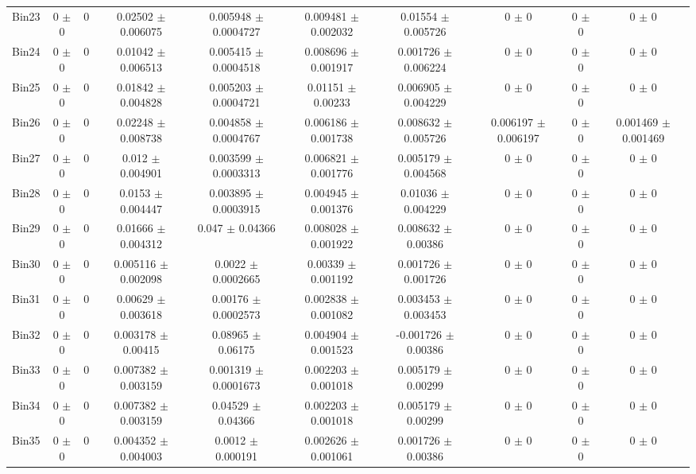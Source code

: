 \begin{tabular}{@{\extracolsep{4pt}}lccccccccc@{}}
     Bin23 & 0 $\pm$ 0 & 0 & 0.02502 $\pm$ 0.006075 & 0.005948 $\pm$ 0.0004727 & 0.009481 $\pm$ 0.002032 & 0.01554 $\pm$ 0.005726 & 0 $\pm$ 0 & 0 $\pm$ 0 & 0 $\pm$ 0 \\ 
     Bin24 & 0 $\pm$ 0 & 0 & 0.01042 $\pm$ 0.006513 & 0.005415 $\pm$ 0.0004518 & 0.008696 $\pm$ 0.001917 & 0.001726 $\pm$ 0.006224 & 0 $\pm$ 0 & 0 $\pm$ 0 & 0 $\pm$ 0 \\ 
     Bin25 & 0 $\pm$ 0 & 0 & 0.01842 $\pm$ 0.004828 & 0.005203 $\pm$ 0.0004721 & 0.01151 $\pm$ 0.00233 & 0.006905 $\pm$ 0.004229 & 0 $\pm$ 0 & 0 $\pm$ 0 & 0 $\pm$ 0 \\ 
     Bin26 & 0 $\pm$ 0 & 0 & 0.02248 $\pm$ 0.008738 & 0.004858 $\pm$ 0.0004767 & 0.006186 $\pm$ 0.001738 & 0.008632 $\pm$ 0.005726 & 0.006197 $\pm$ 0.006197 & 0 $\pm$ 0 & 0.001469 $\pm$ 0.001469 \\ 
     Bin27 & 0 $\pm$ 0 & 0 & 0.012 $\pm$ 0.004901 & 0.003599 $\pm$ 0.0003313 & 0.006821 $\pm$ 0.001776 & 0.005179 $\pm$ 0.004568 & 0 $\pm$ 0 & 0 $\pm$ 0 & 0 $\pm$ 0 \\ 
     Bin28 & 0 $\pm$ 0 & 0 & 0.0153 $\pm$ 0.004447 & 0.003895 $\pm$ 0.0003915 & 0.004945 $\pm$ 0.001376 & 0.01036 $\pm$ 0.004229 & 0 $\pm$ 0 & 0 $\pm$ 0 & 0 $\pm$ 0 \\ 
     Bin29 & 0 $\pm$ 0 & 0 & 0.01666 $\pm$ 0.004312 & 0.047 $\pm$ 0.04366 & 0.008028 $\pm$ 0.001922 & 0.008632 $\pm$ 0.00386 & 0 $\pm$ 0 & 0 $\pm$ 0 & 0 $\pm$ 0 \\ 
     Bin30 & 0 $\pm$ 0 & 0 & 0.005116 $\pm$ 0.002098 & 0.0022 $\pm$ 0.0002665 & 0.00339 $\pm$ 0.001192 & 0.001726 $\pm$ 0.001726 & 0 $\pm$ 0 & 0 $\pm$ 0 & 0 $\pm$ 0 \\ 
     Bin31 & 0 $\pm$ 0 & 0 & 0.00629 $\pm$ 0.003618 & 0.00176 $\pm$ 0.0002573 & 0.002838 $\pm$ 0.001082 & 0.003453 $\pm$ 0.003453 & 0 $\pm$ 0 & 0 $\pm$ 0 & 0 $\pm$ 0 \\ 
     Bin32 & 0 $\pm$ 0 & 0 & 0.003178 $\pm$ 0.00415 & 0.08965 $\pm$ 0.06175 & 0.004904 $\pm$ 0.001523 & -0.001726 $\pm$ 0.00386 & 0 $\pm$ 0 & 0 $\pm$ 0 & 0 $\pm$ 0 \\ 
     Bin33 & 0 $\pm$ 0 & 0 & 0.007382 $\pm$ 0.003159 & 0.001319 $\pm$ 0.0001673 & 0.002203 $\pm$ 0.001018 & 0.005179 $\pm$ 0.00299 & 0 $\pm$ 0 & 0 $\pm$ 0 & 0 $\pm$ 0 \\ 
     Bin34 & 0 $\pm$ 0 & 0 & 0.007382 $\pm$ 0.003159 & 0.04529 $\pm$ 0.04366 & 0.002203 $\pm$ 0.001018 & 0.005179 $\pm$ 0.00299 & 0 $\pm$ 0 & 0 $\pm$ 0 & 0 $\pm$ 0 \\ 
     Bin35 & 0 $\pm$ 0 & 0 & 0.004352 $\pm$ 0.004003 & 0.0012 $\pm$ 0.000191 & 0.002626 $\pm$ 0.001061 & 0.001726 $\pm$ 0.00386 & 0 $\pm$ 0 & 0 $\pm$ 0 & 0 $\pm$ 0 \\ 

\end{tabular}
